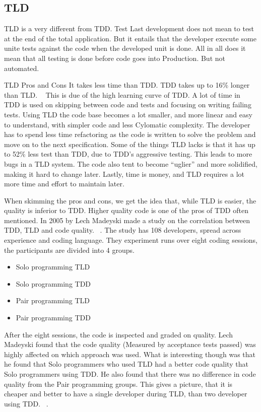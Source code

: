 \subsection{TLD}

TLD is a very different from TDD. Test Last development does not mean to test at the end of the total application.
But it entails that the developer execute some unite tests against the code when the developed unit is done. 
All in all does it mean that all testing is done before code goes into Production. But not automated.~\cite{gm2011}\newline



TLD Pros and Cons
It takes less time than TDD. TDD takes up to 16\% longer than TLD.
~\cite{bl2003} This is due of the high learning curve of TDD. 
A lot of time in TDD is used on skipping between code and tests and focusing on writing failing tests. 
Using TLD the code base becomes a lot smaller, and more linear and easy to understand, 
with simpler code and less Cylomatic complexity. 
The developer has to spend less time refactoring as the code is written to solve the problem and move on to the next specification. 
Some of the things TLD lacks is that it has up to 52\% less test than TDD, 
due to TDD’s aggressive testing. This leads to more bugs in a TLD system. 
The code also tent to become “uglier” and more solidified, making it hard to change later. 
Lastly, time is money, and TLD requires a lot more time and effort to maintain later.~\cite{ss2014}\newline

When skimming the pros and cons, we get the idea that, 
while TLD is easier, the quality is inferior to TDD. 
Higher quality code is one of the pros of TDD often mentioned. 
In 2005 by Lech Madeyski made a study on the correlation between TDD, 
TLD and code quality. ~\cite{lm2005}. The study has 108 developers, 
spread across experience and coding language. 
They experiment runs over eight coding sessions, the participants are divided into 4 groups.
\begin{itemize}
    \item Solo programming TLD
    \item Solo programming TDD
    \item Pair programming TLD
    \item Pair programming TDD
\end{itemize}

After the eight sessions, the code is inspected and graded on quality. 
Lech Madeyski found that the code quality (Measured by acceptance tests passed) 
was highly affected on which approach was used. 
What is interesting though was that he found that Solo programmers who used TLD had a better 
code quality that Solo programmers using TDD. He also found that there was no difference in code 
quality from the Pair programming groups. This gives a picture, that it is cheaper and better to have a 
single developer during TLD, than two developer using TDD. ~\cite{lm2005}.



